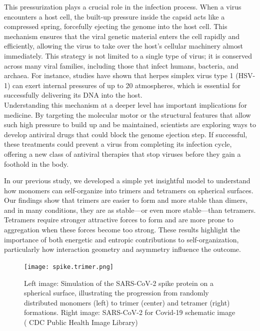 \documentclass[12pt]{article}
\begin{document}
\begin{flushleft}
This pressurization plays a crucial role in the infection process. When a virus encounters a host cell, the built-up pressure inside the capsid acts like a compressed spring, forcefully ejecting the genome into the host cell. This mechanism ensures that the viral genetic material enters the cell rapidly and efficiently, allowing the virus to take over the host’s cellular machinery almost immediately. This strategy is not limited to a single type of virus; it is conserved across many viral families, including those that infect humans, bacteria, and archaea. For instance, studies have shown that herpes simplex virus type 1 (HSV-1) can exert internal pressures of up to 20 atmospheres, which is essential for successfully delivering its DNA into the host\cite{BrandarizNunez2019}.\\




Understanding this mechanism at a deeper level has important implications for medicine. By targeting the molecular motor or the structural features that allow such high pressure to build up and be maintained, scientists are exploring ways to develop antiviral drugs that could block the genome ejection step. If successful, these treatments could prevent a virus from completing its infection cycle, offering a new class of antiviral therapies that stop viruses before they gain a foothold in the body. 




In our previous study, we developed a simple yet insightful model to understand how monomers can self-organize into trimers and tetramers on spherical surfaces. Our findings show that trimers are easier to form and more stable than dimers, and in many conditions, they are as stable—or even more stable—than tetramers. Tetramers require stronger attractive forces to form and are more prone to aggregation when these forces become too strong. These results highlight the importance of both energetic and entropic contributions to self-organization, particularly how interaction geometry and asymmetry influence the outcome.



\begin{figure}[!ht]
  \centering
  \texttt{[image: spike.trimer.png]}
  \caption{Left image: Simulation of the SARS-CoV-2 spike protein on a spherical surface, illustrating the progression from randomly distributed monomers (left) to trimer (center) and tetramer (right) formations. Right image: SARS-CoV-2 for Covid-19 schematic image ( CDC Public
Health Image Library) \cite{cdc-covid}}
\end{figure}






\end{flushleft}
\end{document}
